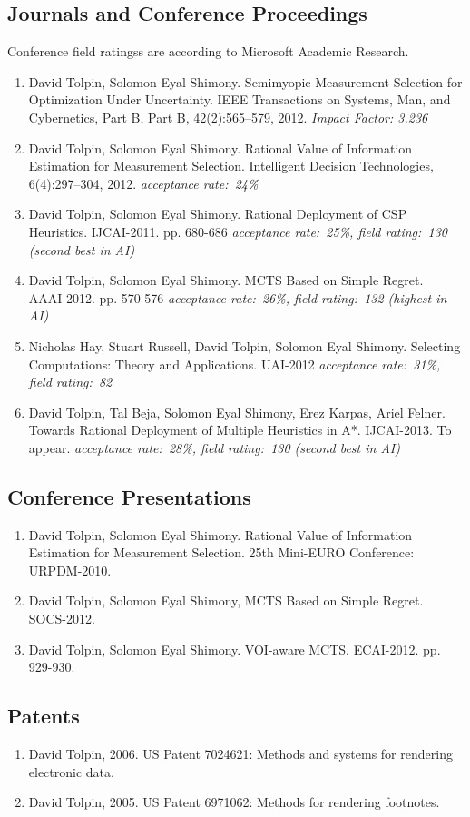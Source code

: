 \documentclass{article}
\begin{document}
\subsection*{Journals and Conference Proceedings}

\small{Conference field ratingss are according to Microsoft Academic
  Research}.

\begin{enumerate}
\item David Tolpin, Solomon Eyal Shimony. Semimyopic Measurement
            Selection for Optimization Under Uncertainty. IEEE
            Transactions on Systems, Man, and Cybernetics, Part B, Part B,
            42(2):565–579, 2012. \emph{Impact Factor: 3.236}
\item David Tolpin, Solomon Eyal Shimony. Rational Value of
            Information Estimation for Measurement Selection. Intelligent
            Decision Technologies, 6(4):297--304, 2012. \emph{acceptance
            rate:~24\%}
\item David Tolpin, Solomon Eyal Shimony. Rational Deployment of CSP
            Heuristics. IJCAI-2011. pp. 680-686 \emph{acceptance
              rate:~25\%, field rating:~130 (second best in AI)}
\item David Tolpin, Solomon Eyal Shimony. MCTS Based on Simple
            Regret. AAAI-2012. pp. 570-576 \emph{acceptance rate:~26\%,
                                field rating:~132 (highest in AI)}
\item Nicholas Hay, Stuart Russell, David Tolpin, Solomon Eyal
            Shimony. Selecting Computations: Theory and Applications.
            UAI-2012 \emph{acceptance rate:~31\%, field rating:~82}
\item David Tolpin, Tal Beja, Solomon Eyal Shimony, Erez Karpas,
            Ariel Felner. Towards Rational Deployment of Multiple
            Heuristics in A*. IJCAI-2013. To appear. \emph{acceptance
              rate:~28\%, field rating:~130 (second best in AI)}
\end{enumerate}


\subsection*{Conference Presentations}
\begin{enumerate}
\item David Tolpin, Solomon Eyal Shimony. Rational Value of
            Information Estimation for Measurement Selection. 25th
            Mini-EURO Conference: URPDM-2010.
\item David Tolpin, Solomon Eyal Shimony, MCTS Based on Simple
  Regret. SOCS-2012.
\item David Tolpin, Solomon Eyal Shimony. VOI-aware MCTS. ECAI-2012.
            pp. 929-930.
\end{enumerate}

\subsection*{Patents}
\begin{enumerate}
\item David Tolpin, 2006. US Patent 7024621: Methods and systems for
            rendering electronic data.
\item David Tolpin, 2005. US Patent 6971062: Methods for rendering
            footnotes.
\end{enumerate}
\end{document}
